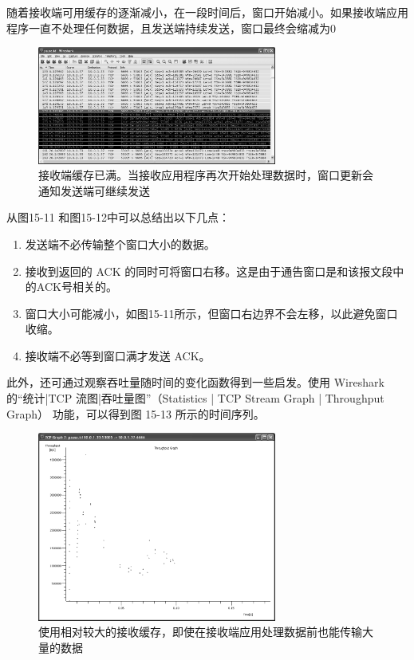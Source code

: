 随着接收端可用缓存的逐渐减小，在一段时间后，窗口开始减小。如果接收端应用程序一直不处理任何数据，且发送端持续发送，窗口最终会缩减为0
\begin{figure}[!htb]
    \centering
	\includegraphics[width=0.7\textwidth]{imgs/15/15-12.png}
	\caption{接收端缓存已满。当接收应用程序再次开始处理数据时，窗口更新会通知发送端可继续发送}
\end{figure}

从图15-11 和图15-12中可以总结出以下几点：
\begin{enumerate}
    \item 发送端不必传输整个窗口大小的数据。
    \item 接收到返回的 ACK 的同时可将窗口右移。这是由于通告窗口是和该报文段中的ACK号相关的。
    \item 窗口大小可能减小，如图15-11所示，但窗口右边界不会左移，以此避免窗口收缩。
    \item 接收端不必等到窗口满才发送 ACK。
\end{enumerate}

此外，还可通过观察吞吐量随时间的变化函数得到一些启发。使用 Wireshark的“统计|TCP 流图|吞吐量图”（Statistics | TCP Stream Graph | Throughput Graph） 功能，可以得到图
15-13 所示的时间序列。
\begin{figure}[!htb]
    \centering
	\includegraphics[width=0.7\textwidth]{imgs/15/15-13.png}
	\caption{使用相对较大的接收缓存，即使在接收端应用处理数据前也能传输大量的数据}
\end{figure}

